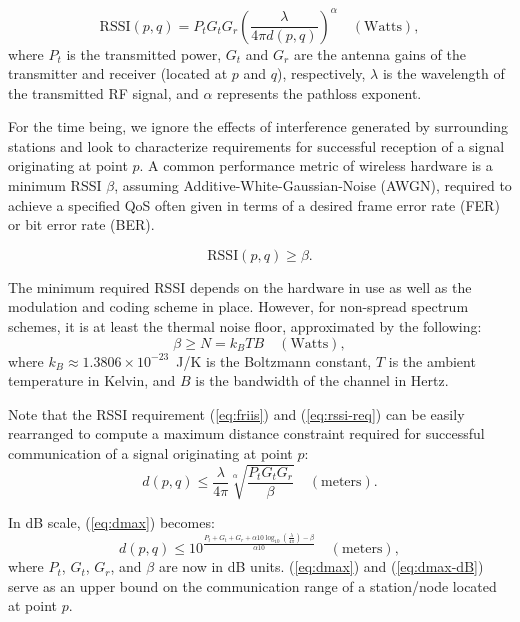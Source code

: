 \documentclass{article}
\newcommand{\rssi}{\textrm{RSSI}}
\begin{document}
\begin{equation}
\rssi(p,q) = P_tG_tG_r\left(\frac{\lambda}{4\pi d(p,q)}\right)^{\alpha} \quad (\textrm{Watts}),
\label{eq:friis}
\end{equation}
%
where \(P_t\) is the transmitted power, \(G_t\) and \(G_r\) are the antenna gains of the transmitter and receiver (located at \(p\) and \(q\)), respectively, \(\lambda\) is the wavelength of the transmitted RF signal, and \(\alpha\) represents the pathloss exponent.


For the time being, we ignore the effects of interference generated by surrounding stations and look to characterize requirements for successful reception of a signal originating at point \(p\).
A common performance metric of wireless hardware is a minimum RSSI \(\beta\), assuming Additive-White-Gaussian-Noise (AWGN), required to achieve a specified QoS often given in terms of a desired frame error rate (FER) or bit error rate (BER).

\begin{equation}
\rssi(p,q) \geq \beta.
\label{eq:rssi-req}
\end{equation}


The minimum required RSSI depends on the hardware in use as well as the modulation and coding scheme in place.
However, for non-spread spectrum schemes, it is at least the thermal noise floor, approximated by the following:
%
\begin{equation}
\beta \geq N = k_BTB \quad (\textrm{Watts}),
\label{eq:noise}
\end{equation}
%
where \(k_B \approx 1.3806\times10^{-23}\)~J/K is the Boltzmann constant, \(T\) is the ambient temperature in Kelvin, and \(B\) is the bandwidth of the channel in Hertz.


Note that the RSSI requirement (\ref{eq:friis}) and (\ref{eq:rssi-req}) can be easily rearranged to compute a maximum distance constraint required for successful communication of a signal originating at point \(p\):
%
\begin{equation}
d(p,q) \leq \frac{\lambda}{4\pi}\sqrt[\alpha]{\frac{P_tG_tG_r}{\beta}} \quad (\textrm{meters}).
\label{eq:dmax}
\end{equation}


In dB scale, (\ref{eq:dmax}) becomes:
%
\begin{equation}
d(p,q) \leq 10^{\frac{P_t + G_t + G_r + \alpha 10 \log_{10}(\frac{\lambda}{4\pi}) - \beta}{\alpha 10}} \quad
(\textrm{meters}),
\label{eq:dmax-dB}
\end{equation}
%
where \(P_t\), \(G_t\), \(G_r\), and \(\beta\) are now in dB units.
(\ref{eq:dmax}) and (\ref{eq:dmax-dB}) serve as an upper bound on the communication range of a station/node located at point \(p\).
\end{document}
